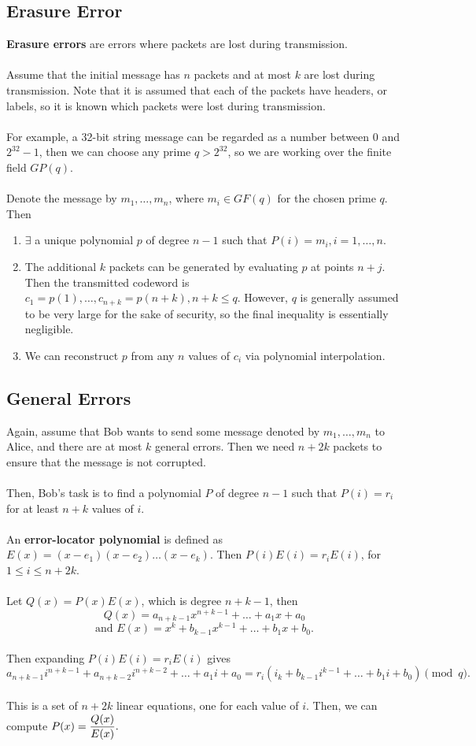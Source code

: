\documentclass{article}
\theoremstyle{definition}
\begin{document}
\subsection*{Erasure Error}
\textbf{Erasure errors} are errors where packets are lost during transmission. \\ \\
Assume that the initial message has $n$ packets and at most $k$ are lost during transmission. Note that it is assumed that each of the packets have headers, or labels, so it is known which packets were lost during transmission. \\ \\
For example, a 32-bit string message can be regarded as a number between $0$ and $2^{32} - 1$, then we can choose any prime $q > 2^{32}$, so we are working over the finite field $GP(q)$. \\ \\
Denote the message by $m_1, \dots, m_n$, where $m_i \in GF(q)$ for the chosen prime $q$. Then \begin{enumerate}
    \item $\exists$ a unique polynomial $p$ of degree $n - 1$ such that $P(i) = m_i, i = 1, \dots, n$. 
    \item The additional $k$ packets can be generated by evaluating $p$ at points $n + j$. Then the transmitted codeword is $c_1 = p(1), \dots, c_{n + k} = p(n + k), n + k \leq q$. However, $q$ is generally assumed to be very large for the sake of security, so the final inequality is essentially negligible. 
    \item We can reconstruct $p$ from any $n$ values of $c_i$ via polynomial interpolation. 
\end{enumerate}
\subsection*{General Errors}
Again, assume that Bob wants to send some message denoted by $m_1, \dots, m_n$ to Alice, and there are at most $k$ general errors. Then we need $n + 2k$ packets to ensure that the message is not corrupted. \\ \\
Then, Bob’s task is to find a polynomial $P$ of degree $n - 1$ such that $P(i) = r_i$ for at least $n + k$ values of $i$. \\ \\
An \textbf{error-locator polynomial} is defined as $E(x) = (x - e_1)(x - e_2) \dots (x - e_k)$. Then $P(i)E(i) = r_iE(i)$, for $1 \leq i \leq n + 2k$. \\ \\
Let $Q(x) = P(x)E(x)$, which is degree $n + k - 1$, then $$Q(x) = a_{n + k - 1}x^{n + k - 1} + \dots + a_1x + a_0$$ $$\text{and } E(x) = x^k +b_{k - 1}x^{k - 1} + \dots + b_1x + b_0.$$ \\
Then expanding $P(i)E(i) = r_iE(i)$ gives $$a_{n + k - 1}i^{n + k - 1} + a_{n + k - 2}i^{n + k - 2} + \dots + a_1i + a_0 = r_i(i_k +b_{k - 1}i^{k - 1} + \dots + b_1i + b_0) \pmod{q}.$$ \\
This is a set of $n + 2k$ linear equations, one for each value of $i$. Then, we can compute $P(x) = \mathlarger{\frac{Q(x)}{E(x)}}.$ 
\end{document}
